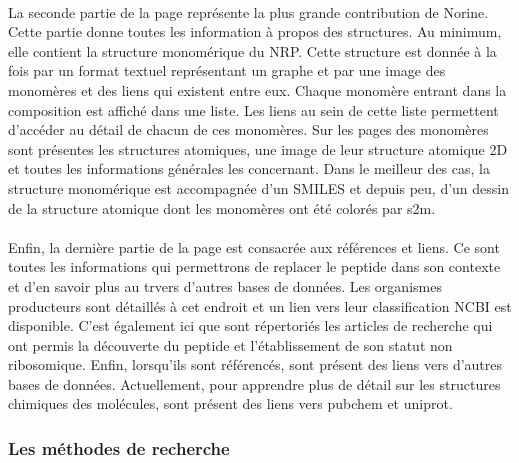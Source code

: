\documentclass[12pt,french,twoside]{report}
\begin{document}
\paragraph{}La seconde partie de la page représente la plus grande contribution de Norine.
Cette partie donne toutes les information à propos des structures.
Au minimum, elle contient la structure monomérique du NRP.
Cette structure est donnée à la fois par un format textuel représentant un graphe et par une image des monomères et des liens qui existent entre eux.
Chaque monomère entrant dans la composition est affiché dans une liste.
Les liens au sein de cette liste permettent d'accéder au détail de chacun de ces monomères.
Sur les pages des monomères sont présentes les structures atomiques, une image de leur structure atomique 2D et toutes les informations générales les concernant.
Dans le meilleur des cas, la structure monomérique est accompagnée d'un SMILES et depuis peu, d'un dessin de la structure atomique dont les monomères ont été colorés par s2m.

\paragraph{}Enfin, la dernière partie de la page est consacrée aux références et liens.
Ce sont toutes les informations qui permettrons de replacer le peptide dans son contexte et d'en savoir plus au trvers d'autres bases de données.
Les organismes producteurs sont détaillés à cet endroit et un lien vers leur classification NCBI est disponible.
C'est également ici que sont répertoriés les articles de recherche qui ont permis la découverte du peptide et l'établissement de son statut non ribosomique.
Enfin, lorsqu'ils sont référencés, sont présent des liens vers d'autres bases de données.
Actuellement, pour apprendre plus de détail sur les structures chimiques des molécules, sont présent des liens vers pubchem et uniprot.


\subsubsection{Les méthodes de recherche}
\end{document}
